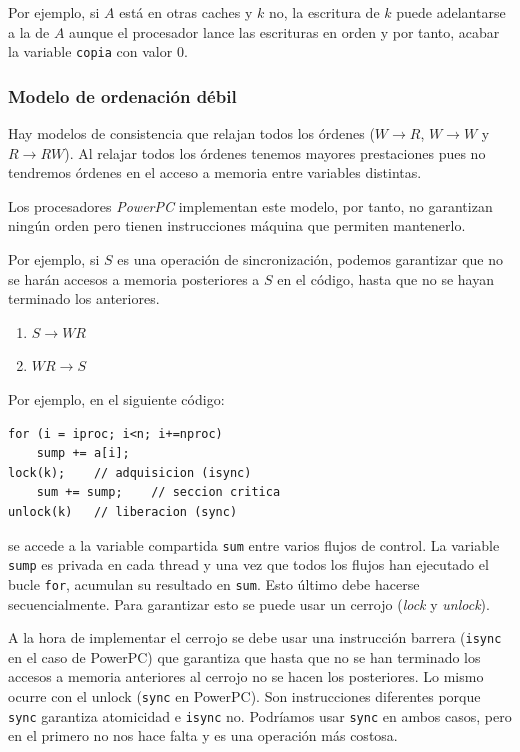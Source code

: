 \documentclass[10pt,a4paper,spanish]{report}
\begin{document}
Por ejemplo, si $A$ está en otras caches y $k$ no, la escritura de $k$ puede adelantarse a la de $A$ aunque el procesador lance las escrituras en orden y por tanto, acabar la variable \verb*|copia| con valor $0$.

\textcolor[rgb]{0.2,0.4,0.8}{\subsubsection{Modelo de ordenación débil}}
Hay modelos de consistencia que relajan todos los órdenes ($W \rightarrow R$, $W \rightarrow W$ y $R \rightarrow RW$). Al relajar todos los órdenes tenemos mayores prestaciones pues no tendremos órdenes en el acceso a memoria entre variables distintas.

Los procesadores \textcolor[rgb]{0.2,0.4,0.8}{\textit{PowerPC}} implementan este modelo, por tanto, no garantizan ningún orden pero tienen instrucciones máquina que permiten mantenerlo.

Por ejemplo, si $S$ es una operación de sincronización, podemos garantizar que no se harán accesos a memoria posteriores a $S$ en el código, hasta que no se hayan terminado los anteriores. %
\begin{enumerate}[\color{azul}{\bf $\heartsuit$}]
    \item \textcolor[rgb]{0.2,0.4,0.8}{$S \rightarrow WR$} 

    \item \textcolor[rgb]{0.2,0.4,0.8}{$WR \rightarrow S$}
\end{enumerate}

Por ejemplo, en el siguiente código:

\begin{verbatim}
for (i = iproc; i<n; i+=nproc)
    sump += a[i];
lock(k);    // adquisicion (isync)
    sum += sump;    // seccion critica
unlock(k)   // liberacion (sync)
\end{verbatim}

se accede a la variable compartida \verb*|sum| entre varios flujos de control. La variable \verb*|sump| es privada en cada thread y una vez que todos los flujos han ejecutado el bucle \verb*|for|, acumulan su resultado en \verb*|sum|. Esto último debe hacerse secuencialmente. Para garantizar esto se puede usar un cerrojo (\textcolor[rgb]{0.2,0.4,0.8}{\textit{lock}} y \textcolor[rgb]{0.2,0.4,0.8}{\textit{unlock}}). 

A la hora de implementar el cerrojo se debe usar una instrucción barrera (\verb*|isync| en el caso de PowerPC) que garantiza que hasta que no se han terminado los accesos a memoria anteriores al cerrojo no se hacen los posteriores. Lo mismo ocurre con el unlock (\verb*|sync| en PowerPC). Son instrucciones diferentes porque \verb*|sync| garantiza atomicidad e \verb*|isync| no. Podríamos usar \verb*|sync| en ambos casos, pero en el primero no nos hace falta y es una operación más costosa.
\end{document}
